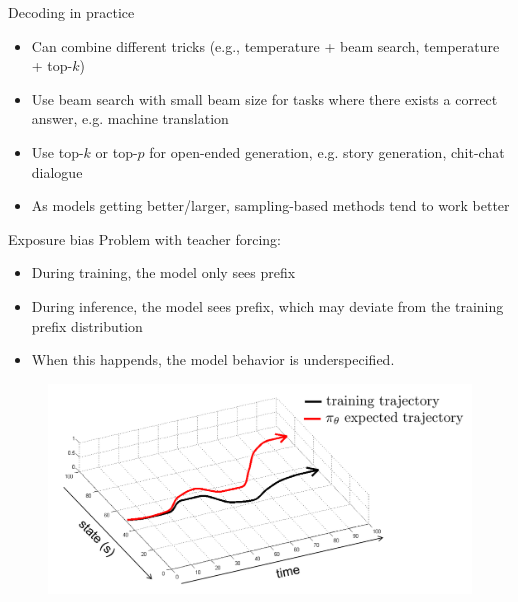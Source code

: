 \documentclass[usenames,dvipsnames,notes,11pt,aspectratio=169,hyperref={colorlinks=true, linkcolor=blue}]{beamer}
\begin{document}
\begin{frame}
    {Decoding in practice}
    \begin{itemize}
        \itemsep1em
        \item Can combine different tricks (e.g., temperature + beam search, temperature + top-$k$)
        \item Use beam search with small beam size for tasks where there exists a correct answer, e.g. machine translation
        \item Use top-$k$ or top-$p$ for open-ended generation, e.g. story generation, chit-chat dialogue
        \item As models getting better/larger, sampling-based methods tend to work better
    \end{itemize}
\end{frame}

\begin{frame}
    {Exposure bias}
    Problem with teacher forcing:\\
    \begin{itemize}
        \item During training, the model only sees  prefix
        \item During inference, the model sees  prefix, which may deviate from the training prefix distribution
        \item When this happends, the model behavior is underspecified.
    \end{itemize}

    \begin{figure}
        \includegraphics[height=0.5\textheight]{figures/exposure}
    \end{figure}
\end{frame}
\end{document}

